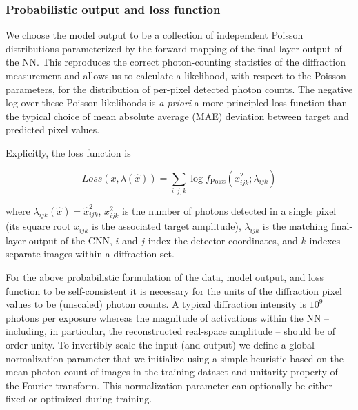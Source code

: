 \documentclass[sn-mathphys]{sn-jnl}%
\theoremstyle{thmstyleone}%
\theoremstyle{thmstyletwo}%
\theoremstyle{thmstylethree}%
\begin{document}
\subsubsection{Probabilistic output and loss function}

%

We choose the model output to be a collection of independent Poisson distributions parameterized by the forward-mapping of the final-layer output of the NN. This reproduces the correct photon-counting statistics of the diffraction measurement and allows us to calculate a likelihood, with respect to the Poisson parameters, for the distribution of per-pixel detected photon counts. The negative log over these Poisson likelihoods is \emph{a priori} a more principled loss function than the typical choice of mean absolute average (MAE) deviation between target and predicted pixel values.

Explicitly, the loss function is

$$
Loss(x, \lambda(\hat{x})) = \sum_{i,j,k}\log f_{\text{Poiss}}(x_{ijk}^2;\lambda_{ijk})
$$


where $\lambda_{ijk}(\hat{x}) = \hat{x}_{ijk}^2$, $x_{ijk}^2$ is the number of photons detected in a single pixel (its square root $x_{ijk}$ is the associated target amplitude), $\lambda_{ijk}$ is the matching final-layer output of the CNN, $i$ and $j$ index the detector coordinates, and $k$ indexes separate images within a diffraction set. 

For the above probabilistic formulation of the data, model output, and loss function to be self-consistent it is necessary for the units of the diffraction pixel values to be (unscaled) photon counts. A typical diffraction intensity is $10^9$ photons per exposure whereas the magnitude of activations within the NN -- including, in particular, the reconstructed real-space amplitude -- should be of order unity. To invertibly scale the input (and output) we define a global normalization parameter that we initialize using a simple heuristic based on the mean photon count of images in the training dataset and unitarity property of the Fourier transform.   This normalization parameter can optionally be either fixed or optimized during training. 
\end{document}
